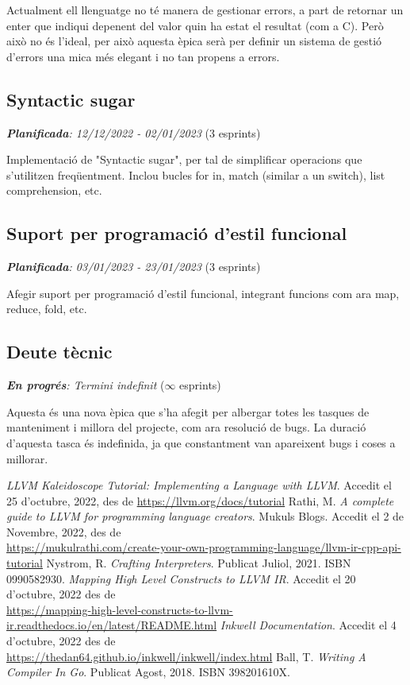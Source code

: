 ﻿\documentclass{article}
\begin{document}
Actualment ell llenguatge no té manera de gestionar errors, a part de retornar
un enter que indiqui depenent del valor quin ha estat el resultat (com a C). 
Però això no és l'ideal, per això aquesta èpica serà per definir un sistema de
gestió d'errors una mica més elegant i no tan propens a errors.

\subsection{Syntactic sugar}
\textit{\textbf{Planificada}: 12/12/2022 - 02/01/2023} (3 esprints)

Implementació de "Syntactic sugar", per tal de simplificar operacions que
s'utilitzen freqüentment. Inclou bucles for in, match (similar a un switch),
list comprehension, etc.

\subsection{Suport per programació d'estil funcional}
\textit{\textbf{Planificada}: 03/01/2023 - 23/01/2023} (3 esprints)

Afegir suport per programació d'estil funcional, integrant funcions com ara map,
reduce, fold, etc.

\subsection{Deute tècnic}
\textit{\textbf{En progrés}: Termini indefinit} ($\infty$ esprints)

Aquesta és una nova èpica que s'ha afegit per albergar totes les tasques de 
manteniment i millora del projecte, com ara resolució de bugs. La duració 
d'aquesta tasca és indefinida, ja que constantment van apareixent bugs i coses
a millorar.

\newpage
\renewcommand\refname{Bibliografia}
\begin{thebibliography}{9}

 \textit{LLVM Kaleidoscope Tutorial: Implementing a Language with LLVM}. Accedit el 25 d'octubre, 2022, des de \url{https://llvm.org/docs/tutorial}
 Rathi, M. \textit{A complete guide to LLVM for programming language creators}. Mukuls Blogs. Accedit el 2 de Novembre, 2022, des de \\\url{https://mukulrathi.com/create-your-own-programming-language/llvm-ir-cpp-api-tutorial}
 Nystrom, R. \textit{Crafting Interpreters}. Publicat Juliol, 2021. ISBN 0990582930.
 \textit{Mapping High Level Constructs to LLVM IR}. Accedit el 20 d'octubre, 2022 des de \\\url{https://mapping-high-level-constructs-to-llvm-ir.readthedocs.io/en/latest/README.html}
 \textit{Inkwell Documentation}. Accedit el 4 d'octubre, 2022 des de \\\url{https://thedan64.github.io/inkwell/inkwell/index.html}
 Ball, T. \textit{Writing A Compiler In Go}. Publicat Agost, 2018. ISBN 398201610X.

\end{thebibliography}
\end{document}
